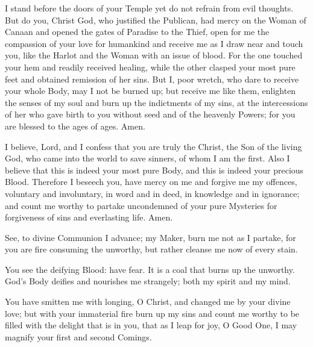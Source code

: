 
I stand before the doors of your Temple yet do not refrain from evil thoughts. But do you, Christ God, who justified the Publican, had mercy on the Woman of Canaan and opened the gates of Paradise to the Thief, open for me the compassion of your love for humankind and receive me as I draw near and touch you, like the Harlot and the Woman with an issue of blood. For the one touched your hem and readily received healing, while the other clasped your most pure feet and obtained remission of her sins. But I, poor wretch, who dare to receive your whole Body, may I not be burned up; but receive me like them, enlighten the senses of my soul and burn up the indictments of my sins, at the intercessions of her who gave birth to you without seed and of the heavenly Powers; for you are blessed to the ages of ages. Amen.


I believe, Lord, and I confess that you are truly the Christ, the Son of the living God, who came into the world to save sinners, of whom I am the first. Also I believe that this is indeed your most pure Body, and this is indeed your precious Blood. Therefore I beseech you, have mercy on me and forgive me my offences, voluntary and involuntary, in word and in deed, in knowledge and in ignorance; and count me worthy to partake uncondemned of your pure Mysteries for forgiveness of sins and everlasting life. Amen.


See, to divine Communion I advance; my Maker, burn me not as I partake, for you are fire consuming the unworthy, but rather cleanse me now of every stain.


\mysticalsupper


You see the deifying Blood: have fear. It is a coal that burns up the unworthy. God's Body deifies and nourishes me strangely; both my spirit and my mind.


You have smitten me with longing, O Christ, and changed me by your divine love; but with your immaterial fire burn up my sins and count me worthy to be filled with the delight that is in you, that as I leap for joy, O Good One, I may magnify your first and second Comings.

